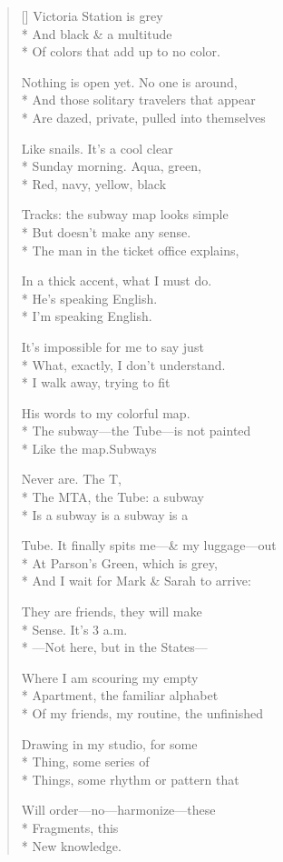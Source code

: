 \label{ch:subway_maps}
\settowidth{\versewidth}{Tube. It finally spits me—\& my luggage—out}
\begin{verse}[\versewidth]
Victoria Station is grey\\*
And black \& a multitude\\*
Of colors that add up to no color.

Nothing is open yet.   No one is around,\\*
And those solitary travelers that appear\\*
Are dazed, private, pulled into themselves

Like snails.   It's a cool clear\\*
Sunday morning.  Aqua, green,\\*
Red, navy, yellow, black

Tracks: the subway map looks simple\\*
But doesn't make any sense.\\*
The man in the ticket office explains,

In a thick accent, what I must do.\\*
He's speaking English.\\*
I'm speaking English.

It's impossible for me to say just\\*
What, exactly, I don't understand.\\*
I walk away, trying to fit

His words to my colorful map.\\*
The subway---the Tube---is not painted\\*
Like the map.\qquad Subways

Never are. The T,\\*
The MTA, the Tube: a subway\\*
Is a subway is a subway is a

Tube. It finally spits me---\& my luggage---out\\*
At Parson's Green, which is grey,\\*
And I wait for Mark \& Sarah to arrive:

They are friends, they will make\\*
Sense. It's 3 a.m.\\*
---Not here, but in the States---

Where I am scouring my empty\\*
Apartment, the familiar alphabet\\*
Of my friends, my routine, the unfinished

Drawing in my studio, for some\\*
Thing, some series of\\*
Things, some rhythm or pattern that

Will order---no---harmonize---these\\*
Fragments, this\\*
New knowledge.
\end{verse}
